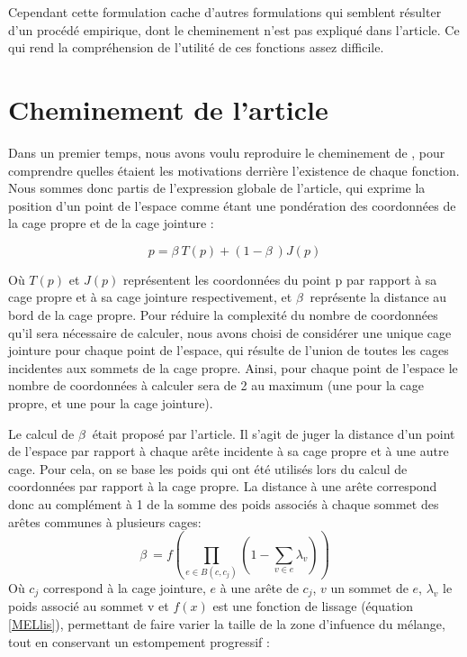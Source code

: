 Cependant cette formulation cache d'autres formulations qui semblent
résulter d'un procédé empirique, dont le cheminement n'est pas
expliqué dans l'article. Ce qui rend la compréhension de l'utilité de
ces fonctions assez difficile.

\section{Cheminement de l'article}
Dans un premier temps, nous avons voulu reproduire le cheminement de
\cite{GPCP13}, pour comprendre quelles étaient les motivations
derrière l'existence de chaque fonction. Nous sommes donc partis de
l'expression globale de l'article, qui exprime la position d'un point
de l'espace comme étant une pondération des coordonnées de la cage
propre et de la cage jointure :

\begin{equation}
  p = \beta~ T(p)  + (1 - \beta~) J(p) 
  \label{MELgen}
\end{equation}

Où $T(p)$ et $J(p)$ représentent les coordonnées du point p par
rapport à sa cage propre et à sa cage jointure respectivement, et
$\beta~$ représente la distance au bord de la cage propre. Pour
réduire la complexité du nombre de coordonnées qu'il sera nécessaire
de calculer, nous avons choisi de considérer une unique cage jointure
pour chaque point de l'espace, qui résulte de l'union de toutes les
cages incidentes aux sommets de la cage propre. Ainsi, pour chaque
point de l'espace le nombre de coordonnées à calculer sera de 2 au
maximum (une pour la cage propre, et une pour la cage jointure).

Le calcul de $\beta~$ était proposé par l'article. Il s'agit de juger
la distance d'un point de l'espace par rapport à chaque arête
incidente à sa cage propre et à une autre cage. Pour cela, on se base
les poids qui ont été utilisés lors du calcul de coordonnées par
rapport à la cage propre. La distance à une arête correspond donc au
complément à 1 de la somme des poids associés à chaque sommet des
arêtes communes à plusieurs cages:
\begin{equation}
  \beta~ = f(\prod_{e \in B(c,c_j)} (1 - \sum_{v \in e} \lambda_v))
\end{equation}
Où $c_j$ correspond à la cage jointure, $e$ à une arête de $c_j$, $v$
un sommet de $e$, $\lambda_v$ le poids associé au sommet v et $f(x)$
est une fonction de lissage (équation \ref{MELlis}), permettant de
faire varier la taille de la zone d'infuence du mélange, tout en
conservant un estompement progressif :

